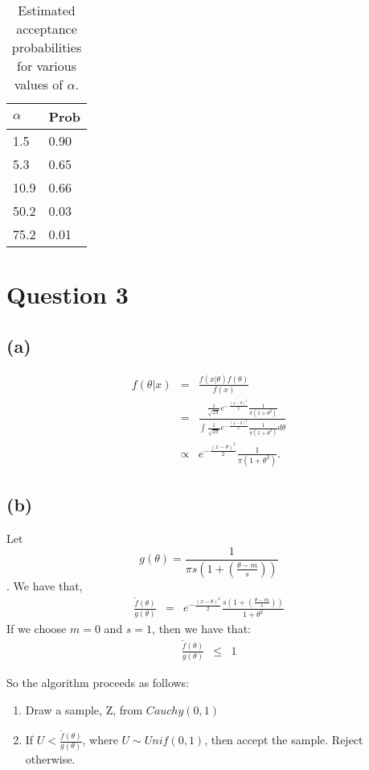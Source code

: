 \documentclass{article}\usepackage[]{graphicx}\usepackage[]{color}
\begin{document}
\begin{table}[ht]
\centering
\begin{tabular}{ll}
  \hline
 $\alpha$ & Prob \\ 
  \hline
1.5 & 0.90 \\ 
5.3 & 0.65 \\ 
10.9 & 0.66 \\ 
50.2 & 0.03 \\ 
75.2 & 0.01 \\ 
   \hline
\end{tabular}
\caption{Estimated acceptance probabilities for various values of $\alpha$.}
\label{tab:probs}
\end{table}

\section*{Question 3}
\subsection*{(a)}
\begin{eqnarray*}
  f(\theta | x) &=& \frac{f(x|\theta)f(\theta)}{f(x)} \\
  &=& \frac{\frac{1}{\sqrt{2\pi}} e^{-\frac{(x-\theta)^2}{2}} \frac{1}{\pi(1+\theta^2)}}{\int\frac{1}{\sqrt{2\pi}} e^{-\frac{(x-\theta)^2}{2}} \frac{1}{\pi(1+\theta^2)} d\theta } \\
  &\propto& e^{-\frac{(x-\theta)^2}{2}} \frac{1}{\pi(1+\theta^2)}.
\end{eqnarray*}

\subsection*{(b)}
Let $$g(\theta)=\frac{1}{\pi s\left(1+\left(\frac{\theta-m}{s}\right)\right)}$$. 
We have that, 
\begin{eqnarray*}
\frac{\tilde{f}(\theta)}{g(\theta)} &=& e^{-\frac{(x-\theta)^2}{2}} \frac{s\left(1+\left(\frac{\theta-m}{s}\right)\right)}{1+\theta^2}
\end{eqnarray*}
If we choose $m=0$ and $s=1$, then we have that:
\begin{eqnarray*}
\frac{\tilde{f}(\theta)}{g(\theta)} &\leq& 1
\end{eqnarray*}

So the algorithm proceeds as follows:
\begin{enumerate}
  \item Draw a sample, Z, from $Cauchy(0,1)$
  \item If $U<\frac{\tilde{f}(\theta)}{g(\theta)}$, where $U\sim Unif(0,1)$, then accept the sample.  Reject otherwise.
\end{enumerate}
\end{document}
